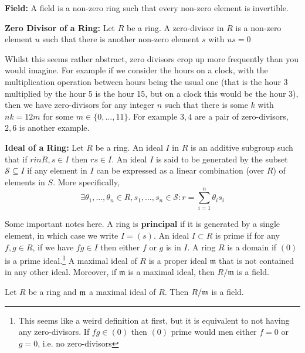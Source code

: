 \begin{definition}
    \textbf{Field: }A field is a non-zero ring such that every non-zero element is invertible. 
\end{definition}

\begin{definition}
    \textbf{Zero Divisor of a Ring: }Let $R$ be a ring. A zero-divisor in $R$ is a non-zero element $u$ such that there is another non-zero element $s$ with $us = 0$
\end{definition}

Whilst this seems rather abstract, zero divisors crop up more frequently than you would imagine. For example if we consider the hours on a clock, with the multiplication operation between hours being the usual one (that is the hour 3 multiplied by the hour 5 is the hour 15, but on a clock this would be the hour 3), then we have zero-divisors for any integer $n$ such that there is some $k$ with $nk = 12m$ for some $m\in \{0,...,11\}$. For example $3,4$ are a pair of zero-divisors, $2,6$ is another example.

\begin{definition}
    \textbf{Ideal of a Ring: }Let $R$ be a ring. An ideal $I$ in $R$ is an additive subgroup such that if $r in R, s\in I$ then $rs \in I$. An ideal $I$ is said to be generated by the subset $\mathcal{S} \subseteq I$ if any element in $I$ can be expressed as a linear combination (over $R$) of elements in $S$. More specifically,
    \[\exists \theta_1,...,\theta_n \in R, s_1,...,s_n \in \mathcal{S}: r = \sum_{i = 1}^n \theta_i s_i\]
\end{definition}

Some important notes here. A ring is \textbf{principal} if it is generated by a single element, in which case we write $I = (s)$. An ideal $I \subset R$ is prime if for any $f,g \in R$, if we have $fg\in I$ then either $f$ or $g$ is in $I$. A ring $R$ is a domain if $(0)$ is a prime ideal.\footnote{This seems like a weird definition at first, but it is equivalent to not having any zero-divisors. If $fg\in (0)$ then $(0)$ prime would men either $f= 0$ or $g = 0$, i.e. no zero-divisors} A maximal ideal of $R$ is a proper ideal $\mathfrak{m}$ that is not contained in any other ideal. Moreover, if $\mathfrak{m}$ is a maximal ideal, then $R/\mathfrak{m}$ is a field. 

\begin{proposition}
    Let $R$ be a ring and $\mathfrak{m}$ a maximal ideal of $R$. Then $R/\mathfrak{m}$ is a field. 
\end{proposition}


